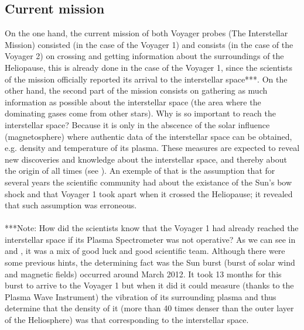 \documentclass[11pt,a4paper]{article}
\begin{document}
\subsection{Current mission}
On the one hand, the current mission of both Voyager probes (The Interstellar Mission) consisted (in the case of the Voyager 1) and consists (in the case of the Voyager 2) on crossing and getting information about the surroundings of the Heliopause, this is already done in the case of the Voyager 1, since the scientists of the mission officially reported its arrival to the interstellar space***. On the other hand, the second part of the mission consists on gathering as much information as possible about the interstellar space (the area where the dominating gases come from other stars). Why is so important to reach the interstellar space? Because it is only in the abscence of the solar influence (magnetosphere) where authentic data of the interstellar space can be obtained, e.g. density and temperature of its plasma. These measures are expected to reveal new discoveries and knowledge about the interstellar space, and thereby about the origin of all times (see \cite{historicjourney}). An exemple of that is the assumption that for several years the scientific community had about the existance of the Sun's bow shock and that Voyager 1 took apart when it crossed the Heliopause; it revealed that such assumption was erroneous.
\\\\
***Note: How did the scientists know that the Voyager 1 had already reached the interstellar space if its Plasma Spectrometer was not operative? As we can see in \cite{edstone} and \cite{howdoweknow}, it was a mix of good luck and good scientific team. Although there were some previous hints, the determining fact was the Sun burst (burst of solar wind and magnetic fields) occurred around March 2012. It took 13 months for this burst to arrive to the Voyager 1 but when it did it could measure (thanks to the Plasma Wave Instrument) the vibration of its surrounding plasma and thus determine that the density of it (more than 40 times denser than the outer layer of the Heliosphere) was that corresponding to the interstellar space.
\end{document}
